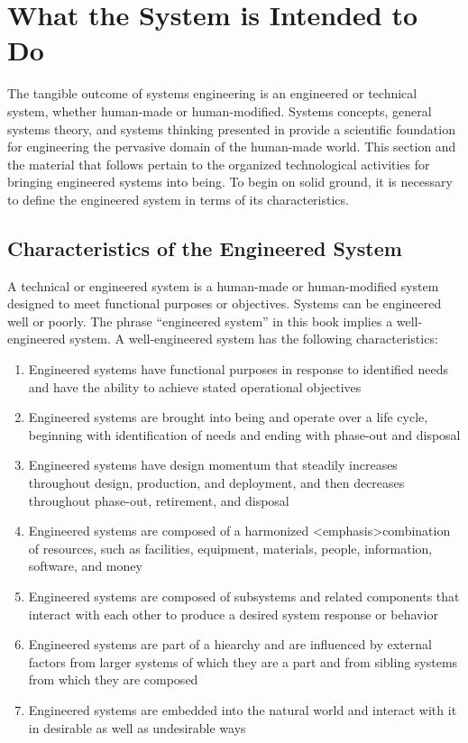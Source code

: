 \section{What the System is Intended to Do}

The tangible outcome of systems engineering is an engineered or technical system, whether human-made or human-modified. Systems concepts, general systems theory, and systems thinking presented in provide a scientific foundation for engineering the pervasive domain of the human-made world. This section and the material that follows pertain to the organized technological activities for bringing engineered systems into being. To begin on solid ground, it is necessary to define the engineered system in terms of its characteristics.

\subsection{Characteristics of the Engineered System}

A technical or engineered system is a human-made or human-modified system designed to meet functional purposes or objectives. Systems can be engineered well or poorly. The phrase ``engineered system'' in this book implies a well-engineered system. A well-engineered system has the following characteristics:

\begin{enumerate}
\item Engineered systems have functional purposes in response to identified needs and have the ability to achieve stated operational objectives
\item Engineered systems are brought into being and operate over a life cycle, beginning with identification of needs and ending with phase-out and disposal
\item Engineered systems have design momentum that steadily increases throughout design, production, and deployment, and then decreases throughout phase-out, retirement, and disposal
\item Engineered systems are composed of a harmonized <emphasis>combination of resources, such as facilities, equipment, materials, people, information, software, and money
\item Engineered systems are composed of subsystems and related components that interact with each other to produce a desired system response or behavior
\item Engineered systems are part of a hiearchy and are influenced by external factors from larger systems of which they are a part and from sibling systems from which they are composed
\item Engineered systems are embedded into the natural world and interact with it in desirable as well as undesirable ways
\end{enumerate}

